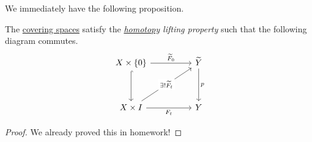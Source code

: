 We immediately have the following proposition.
\begin{proposition}\label{prop:homotopy-lifting-property}
	The \hyperref[def:covering-space]{covering spaces} satisfy the \emph{\hyperref[def:homotopy]{homotopy} lifting property} such that
	the following diagram commutes.
	\[
		\begin{tikzcd}
			{X\times \{0\}} && {\widetilde{Y} } \\
			\\
			{X\times I} && Y
			\arrow["{F_t}"', from=3-1, to=3-3]
			\arrow[hook, from=1-1, to=3-1]
			\arrow["{\widetilde{F}_0 }", from=1-1, to=1-3]
			\arrow["p", from=1-3, to=3-3]
			\arrow["{\exists ! \widetilde{F}_t }"{description}, from=3-1, to=1-3]
		\end{tikzcd}
	\]
\end{proposition}
\begin{proof}
	We already proved this in homework!
\end{proof}

